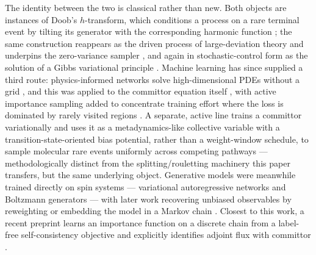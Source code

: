 \documentclass[a4paper,fleqn]{cas-sc}
\begin{document}
The identity between the two is classical rather than new. Both objects are instances of
Doob's $h$-transform, which conditions a process on a rare terminal event by tilting its
generator with the corresponding harmonic function \cite{doob1984}; the same construction
reappears as the driven process of large-deviation theory and underpins the zero-variance
sampler \cite{chetrite2015, touchette2009}, and again in stochastic-control form as the
solution of a Gibbs variational principle \cite{hartmann2019}. Machine learning has since
supplied a third route: physics-informed networks solve high-dimensional PDEs without a
grid \cite{raissi2019}, and this was applied to the committor equation itself
\cite{li2019, khoo2019}, with active importance sampling added to concentrate training
effort where the loss is dominated by rarely visited regions \cite{rotskoff2020}. A
separate, active line trains a committor variationally and uses it as a metadynamics-like
collective variable with a transition-state-oriented bias potential, rather than a
weight-window schedule, to sample molecular rare events uniformly across competing
pathways \cite{trizio2025} --- methodologically distinct from the splitting/rouletting
machinery this paper transfers, but the same underlying object.
Generative models were meanwhile trained directly on spin systems --- variational
autoregressive networks \cite{wu2019} and Boltzmann generators \cite{noe2019} --- with
later work recovering unbiased observables by reweighting \cite{nicoli2020} or embedding
the model in a Markov chain \cite{gabrie2022}. Closest to this work, a recent preprint
learns an importance function on a discrete chain from a label-free self-consistency
objective and explicitly identifies adjoint flux with committor \cite{kim2026}.
\end{document}
